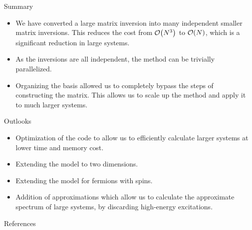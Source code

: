 \documentclass[usenames,dvipsnames]{beamer}
\begin{document}
\begin{frame}{Summary}
	\begin{itemize}
		\item We have converted a large matrix inversion into many independent smaller matrix inversions. This reduces the cost from $ \order{N^3} $ to $ \order{N} $, which is a significant reduction in large systems.
		\item As the inversions are all independent, the method can be trivially parallelized.
		\item Organizing the basis allowed us to completely bypass the steps of constructing the matrix. This allows us to scale up the method and apply it to much larger systems.
	\end{itemize}
\end{frame}

\begin{frame}{Outlooks}
	\begin{itemize}
		\item Optimization of the code to allow us to efficiently calculate larger systems at lower time and memory cost.
		
		\item Extending the model to two dimensions.
		
		\item Extending the model for fermions with spins.
		
		\item Addition of approximations which allow us to calculate the approximate spectrum of large systems, by discarding high-energy excitations.
	\end{itemize}
\end{frame}

\begin{frame}{References}
	
	
\end{frame}
\end{document}
